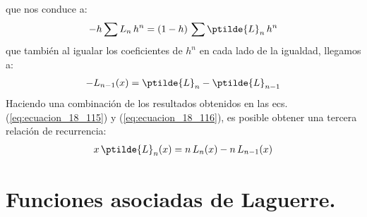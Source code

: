 que nos conduce a:
\begin{align*}
- h \sum L_{n} \, h^{n} =  (1 - h) \, \sum \ptilde{L}_{n} \, h^{n}
\end{align*}
que también al igualar los coeficientes de $h^{n}$ en cada lado de la igualdad, llegamos a:
\begin{align}
- L_{n-1} (x) = \ptilde{L}_{n} - \ptilde{L}_{n-1}
\label{eq:ecuacion_18_116}
\end{align}
Haciendo una combinación de los resultados obtenidos en las ecs. (\ref{eq:ecuacion_18_115}) y (\ref{eq:ecuacion_18_116}), es posible obtener una tercera relación de recurrencia:
\begin{align}
x \, \ptilde{L}_{n} (x) = n \, L_{n} (x) - n \, L_{n-1} (x)
\label{eq:ecuacion_18_117}
\end{align}

\section{Funciones asociadas de Laguerre.}


